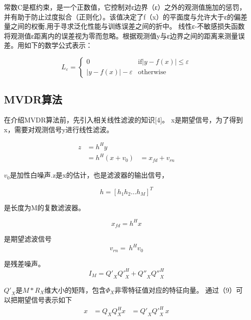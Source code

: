 常数C是框约束，是一个正数值，它控制对ε边界（ε）之外的观测值施加的惩罚，并有助于防止过度拟合（正则化）。该值决定了f（x）的平面度与允许大于ε的偏差量之间的权衡,用于寻求泛化性能与训练误差之间的折中。
线性ε-不敏感损失函数将观测值ε距离内的误差视为零而忽略。根据观测值y与ε边界之间的距离来测量误差。用如下的数学公式表示：

\begin{equation}
L_\varepsilon= 
\begin{cases}
0&               \text{if} |y-f(x)|\leq \varepsilon\\
|y-f(x)|-\varepsilon&       \text{otherwise}
\end{cases}
\end{equation}

\subsection{MVDR算法}
在介绍MVDR算法前，先引入相关线性滤波的知识[4]。
x是期望信号，为了得到x，需要对观测信号y进行线性滤波。

\begin{equation}
\begin{aligned}
z&=h^Hy\\
&= h^H\left(x+v_0\right)
&=x_{fd}+v_{rn}
\end{aligned}
\end{equation}

$v_0$是加性白噪声.z是x的估计，也是滤波器的输出信号，

\begin{equation}
h=\left[h_1h_2\ldots h_M\right]^T
\end{equation}

是长度为M的复数滤波器。

\begin{equation}
x_{fd}= h^Hx
\end{equation}

是期望滤波信号
\begin{equation}
v_{rn}=\ h^Hv_0
\end{equation}

是残差噪声。
\begin{equation}
I_M={Q'}_X{Q'}_X^H+{Q''}_X{Q''}_X^H
\end{equation}

${Q'}_X$是$M*R_X$维大小的矩阵，包含$\Phi_X$非零特征值对应的特征向量。
通过（9）可以把期望信号表示如下
\begin{equation}
\begin{aligned}
x&=Q_XQ_X^Hx
&={Q'}_X{Q'}_X^H\ x
\end{aligned}
\end{equation}

